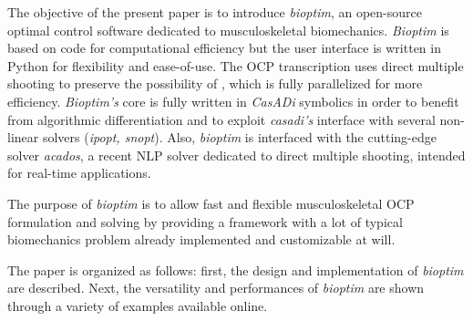 The objective of the present paper is to introduce \textit{bioptim}, an open-source optimal control software dedicated to musculoskeletal biomechanics.
\textit{Bioptim} is based on  code for computational efficiency but the user interface is written in Python for flexibility and ease-of-use. 
The OCP transcription uses direct multiple shooting to preserve the possibility of , which is fully parallelized for more efficiency.
\textit{Bioptim's} core is fully written in \textit{CasADi} symbolics in order to benefit from algorithmic differentiation and to exploit \textit{casadi's} interface with several non-linear solvers (\textit{ipopt, snopt}).
Also, \textit{bioptim} is interfaced with the cutting-edge solver \textit{acados}, a recent NLP solver dedicated to direct multiple shooting, intended for real-time applications.

The purpose of \textit{bioptim} is to allow fast and flexible musculoskeletal OCP formulation and solving by providing a framework with a lot of typical biomechanics problem already implemented and customizable at will.

The paper is organized as follows: first, the design and implementation of \textit{bioptim} are described.
Next, the versatility and performances of \textit{bioptim} are shown through a variety of examples available online. 
